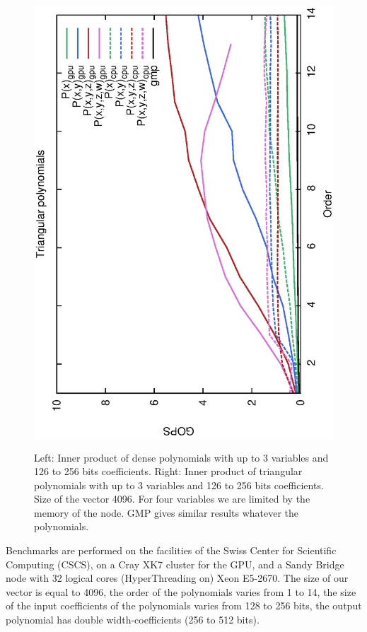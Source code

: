 \documentclass[oribibl]{llncs2e/llncs}
\begin{document}
\begin{figure}[t!]
\begin{center}
{\includegraphics[scale=0.37, angle=-90]{MC128.eps} 
}
\caption{Left: Inner product of dense polynomials with up to 3 variables and 126 to 256 bits coefficients. Right: Inner product of triangular polynomials with up to 3 variables and 126 to 256 bits coefficients.  Size of the vector 4096. For four variables we are limited by the memory of the node. GMP gives similar results whatever the polynomials.}
\label{ResME}
\end{center}
\end{figure}

Benchmarks are performed on the facilities of the Swiss Center for Scientific Computing (CSCS), on a Cray  XK7 cluster for the GPU, and a Sandy Bridge  node with 32 logical cores  (HyperThreading on) Xeon E5-2670. The size of our vector is equal to 4096, the order of the polynomials varies from 1 to 14, the size of the input coefficients of the polynomials varies from 128 to 256 bits, the output polynomial has double width-coefficients (256 to 512 bits). 
\end{document}
